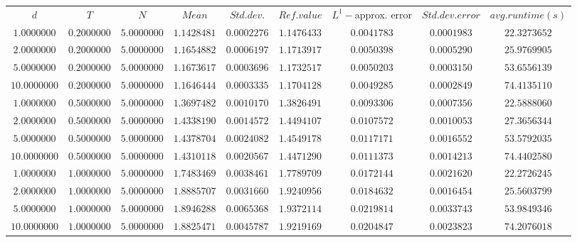 \begin{tabular}{ccccccccc}
$d$ & $T$ & $N$ & $Mean$ & $Std. dev.$ & $Ref. value$ & $L^1-$approx. error & $Std. dev. error$ & $avg. runtime (s)$\\
$1.0000000$ & $0.2000000$ & $5.0000000$ & $1.1428481$ & $0.0002276$ & $1.1476433$ & $0.0041783$ & $0.0001983$ & $22.3273652$\\
$2.0000000$ & $0.2000000$ & $5.0000000$ & $1.1654882$ & $0.0006197$ & $1.1713917$ & $0.0050398$ & $0.0005290$ & $25.9769905$\\
$5.0000000$ & $0.2000000$ & $5.0000000$ & $1.1673617$ & $0.0003696$ & $1.1732517$ & $0.0050203$ & $0.0003150$ & $53.6556139$\\
$10.0000000$ & $0.2000000$ & $5.0000000$ & $1.1646444$ & $0.0003335$ & $1.1704128$ & $0.0049285$ & $0.0002849$ & $74.4135110$\\
$1.0000000$ & $0.5000000$ & $5.0000000$ & $1.3697482$ & $0.0010170$ & $1.3826491$ & $0.0093306$ & $0.0007356$ & $22.5888060$\\
$2.0000000$ & $0.5000000$ & $5.0000000$ & $1.4338190$ & $0.0014572$ & $1.4494107$ & $0.0107572$ & $0.0010053$ & $27.3656344$\\
$5.0000000$ & $0.5000000$ & $5.0000000$ & $1.4378704$ & $0.0024082$ & $1.4549178$ & $0.0117171$ & $0.0016552$ & $53.5792035$\\
$10.0000000$ & $0.5000000$ & $5.0000000$ & $1.4310118$ & $0.0020567$ & $1.4471290$ & $0.0111373$ & $0.0014213$ & $74.4402580$\\
$1.0000000$ & $1.0000000$ & $5.0000000$ & $1.7483469$ & $0.0038461$ & $1.7789709$ & $0.0172144$ & $0.0021620$ & $22.2726245$\\
$2.0000000$ & $1.0000000$ & $5.0000000$ & $1.8885707$ & $0.0031660$ & $1.9240956$ & $0.0184632$ & $0.0016454$ & $25.5603799$\\
$5.0000000$ & $1.0000000$ & $5.0000000$ & $1.8946288$ & $0.0065368$ & $1.9372114$ & $0.0219814$ & $0.0033743$ & $53.9849346$\\
$10.0000000$ & $1.0000000$ & $5.0000000$ & $1.8825471$ & $0.0045787$ & $1.9219169$ & $0.0204847$ & $0.0023823$ & $74.2076018$\\
\end{tabular}
